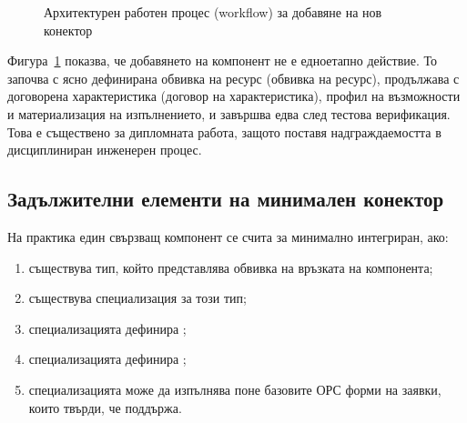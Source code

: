 \begin{figure}[H]
\centering
{}
\caption{Архитектурен работен процес (workflow) за добавяне на нов конектор}
\label{fig:connector_workflow}
\end{figure}

Фигура~\ref{fig:connector_workflow} показва, че добавянето на компонент не е едноетапно действие. То започва с ясно дефинирана обвивка на ресурс (обвивка на ресурс), продължава с договорена характеристика (договор на характеристика), профил на възможности и материализация на изпълнението, и завършва едва след тестова верификация. Това е съществено за дипломната работа, защото поставя надграждаемостта в дисциплиниран инженерен процес.

\subsection{Задължителни елементи на минимален конектор}

На практика един свързващ компонент се счита за минимално интегриран, ако:

\begin{enumerate}[label=\arabic*.]
    \item съществува тип, който представлява обвивка на връзката на компонента;
    \item съществува специализация  за този тип;
    \item специализацията дефинира ;
    \item специализацията дефинира ;
    \item специализацията може да изпълнява поне базовите ОРС форми на заявки, които твърди, че поддържа.
\end{enumerate}

